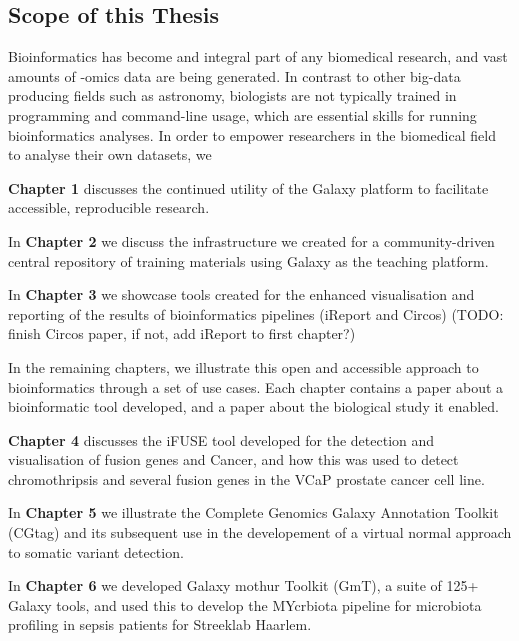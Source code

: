 \begin{justify}
\section{Scope of this Thesis}

Bioinformatics has become and integral part of any biomedical research, and vast amounts of -omics data are being generated. In contrast to other big-data producing fields such as astronomy, biologists are not typically trained in programming and command-line usage, which are essential skills for running bioinformatics analyses. In order to empower researchers in the biomedical field to analyse their own datasets, we

\textbf{Chapter 1} discusses the continued utility of the Galaxy platform to facilitate accessible, reproducible research.

In \textbf{Chapter 2} we discuss the infrastructure we created for a community-driven central repository of training materials using Galaxy as the teaching platform.

In \textbf{Chapter 3} we showcase tools created for the enhanced visualisation and reporting of the results of bioinformatics pipelines (iReport and Circos) (TODO: finish Circos paper, if not, add iReport to first chapter?)

In the remaining chapters, we illustrate this open and accessible approach to bioinformatics through a set of use cases. Each chapter contains a paper about a bioinformatic tool developed, and a paper about the biological study it enabled.

\textbf{Chapter 4} discusses the iFUSE tool developed for the detection and visualisation of fusion genes and Cancer, and how this was used to detect chromothripsis and several fusion genes in the VCaP prostate cancer cell line.

In \textbf{Chapter 5} we illustrate the Complete Genomics Galaxy Annotation Toolkit (CGtag) and its subsequent use in the developement of a virtual normal approach to somatic variant detection.

In \textbf{Chapter 6} we developed Galaxy mothur Toolkit (GmT), a suite of 125+ Galaxy tools, and used this to develop the MYcrbiota pipeline for microbiota profiling in sepsis patients for Streeklab Haarlem.



\end{justify}



